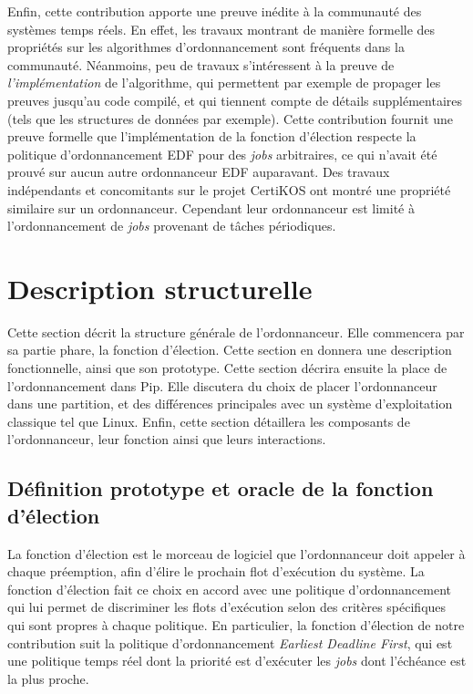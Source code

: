 	Enfin, cette contribution apporte une preuve inédite à la communauté des systèmes temps réels. En effet, les travaux montrant de manière formelle des propriétés sur les algorithmes d'ordonnancement sont fréquents dans la communauté. Néanmoins, peu de travaux s'intéressent à la preuve de \emph{l'implémentation} de l'algorithme, qui permettent par exemple de propager les preuves jusqu'au code compilé, et qui tiennent compte de détails supplémentaires (tels que les structures de données par exemple). Cette contribution fournit une preuve formelle que l'implémentation de la fonction d'élection respecte la politique d'ordonnancement EDF pour des \emph{jobs} arbitraires, ce qui n'avait été prouvé sur aucun autre ordonnanceur EDF auparavant. Des travaux indépendants et concomitants sur le projet CertiKOS ont montré une propriété similaire sur un ordonnanceur. Cependant leur ordonnanceur est limité à l'ordonnancement de \emph{jobs} provenant de tâches périodiques.

	\section{Description structurelle}

	\label{sec:sched_struct_desc}

		Cette section décrit la structure générale de l'ordonnanceur. Elle commencera par sa partie phare, la fonction d'élection. Cette section en donnera une description fonctionnelle, ainsi que son prototype. Cette section décrira ensuite la place de l'ordonnancement dans Pip. Elle discutera du choix de placer l'ordonnanceur dans une partition, et des différences principales avec un système d'exploitation classique tel que Linux. Enfin, cette section détaillera les composants de l'ordonnanceur, leur fonction ainsi que leurs interactions.

		\subsection{Définition prototype et oracle de la fonction d'élection}

		La fonction d'élection est le morceau de logiciel que l'ordonnanceur doit appeler à chaque préemption, afin d'élire le prochain flot d'exécution du système. La fonction d'élection fait ce choix en accord avec une politique d'ordonnancement qui lui permet de discriminer les flots d'exécution selon des critères spécifiques qui sont propres à chaque politique. En particulier, la fonction d'élection de notre contribution suit la politique d'ordonnancement \emph{Earliest Deadline First}, qui est une politique temps réel dont la priorité est d'exécuter les \emph{jobs} dont l'échéance est la plus proche.

